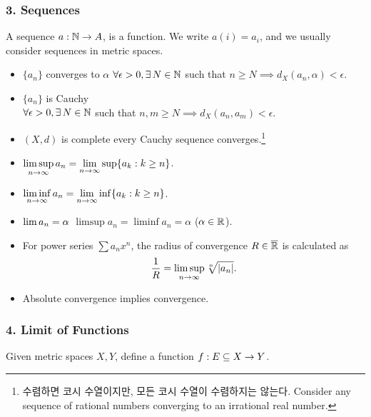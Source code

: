 \subsubsection*{3. Sequences}

A sequence \(a: \mathbb{N} \rightarrow A\), is a function. We write \(a(i) = a_i\), and we usually consider sequences in metric spaces.

\begin{itemize}
    \item \(\{a_n\}\) converges to \(\alpha\) \miff \(\forall \epsilon > 0, \exists N \in \N\) such that \(n \geq N \implies d_X(a_n, \alpha) < \epsilon\).
    \item {} \(\{a_n\}\) is Cauchy\\
          \miff \(\forall \epsilon > 0, \exists N \in \N\) such that \(n, m \geq N \implies d_X(a_n, a_m) < \epsilon\).
    \item \((X, d)\) is complete \miff every Cauchy sequence converges.\footnote{수렴하면 코시 수열이지만, 모든 코시 수열이 수렴하지는 않는다. Consider any sequence of rational numbers converging to an irrational real number.}
    \item \(\displaystyle \limsup_{n\rightarrow \infty} a_n = \lim_{n \rightarrow \infty} \sup \{a_k : k \geq n\}\).
    \item \(\displaystyle \liminf_{n \rightarrow \infty} a_n = \lim_{n \rightarrow \infty} \inf \{a_k : k \geq n\}\).
    \item \(\displaystyle \lim a_n = \alpha\) \miff \(\limsup a_n = \liminf a_n = \alpha\) (\(\alpha \in \mathbb{R}\)).
    \item For power series \(\sum a_n x^n\), the radius of convergence \(R \in \overline{\mathbb{R}}\) is calculated as
          \[
              \frac{1}{R} = \limsup_{n \rightarrow \infty} \sqrt[n]{\left| a_n \right|}.
          \]
    \item Absolute convergence implies convergence.
\end{itemize}

\subsubsection*{4. Limit of Functions}

Given metric spaces \(X, Y\), define a function \(f: E \subseteq X \rightarrow Y\).

